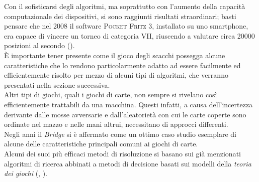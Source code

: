 Con il sofisticarsi degli algoritmi, ma soprattutto con l'aumento della capacità computazionale dei dispositivi, si sono raggiunti risultati straordinari; basti pensare che nel 2008 il software \textsc{Pocket Fritz 3}, installato su uno smartphone, era capace di vincere un torneo di categoria VII, riuscendo a valutare circa 20000 posizioni al secondo (\cite{pocketfritz}).\\
È importante tener presente come il gioco degli scacchi possegga alcune caratteristiche che lo rendono particolarmente adatto ad essere facilmente ed efficientemente risolto per mezzo di alcuni tipi di algoritmi, che verranno presentati nella sezione successiva.\\
Altri tipi di giochi, quali i giochi di carte, non sempre si rivelano così efficientemente trattabili da una macchina.
Questi infatti, a causa dell'incertezza derivante dalle mosse avversarie e dall'aleatorietà con cui le carte coperte sono ordinate nel mazzo e nelle mani altrui, necessitano di approcci differenti.\\
Negli anni il \emph{Bridge} si è affermato come un ottimo caso studio esemplare di alcune delle caratteristiche principali comuni ai giochi di carte.\\
Alcuni dei suoi più efficaci metodi di risoluzione si basano sui già menzionati algoritmi di ricerca abbinati a metodi di decisione basati sui modelli della \emph{teoria dei giochi} (\cite{frank}, \cite{pavel}).
